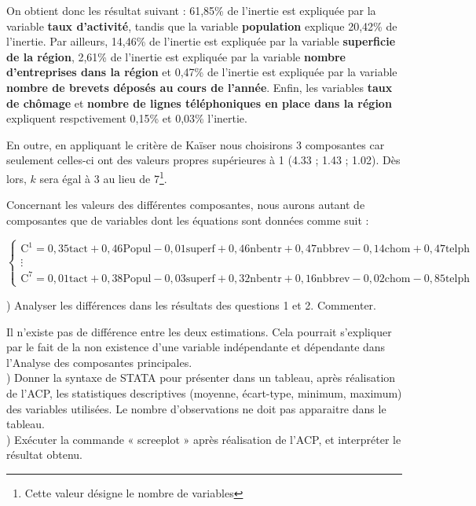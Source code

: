 On obtient donc les résultat suivant : 61,85\% de l'inertie est expliquée par la variable \textbf{taux d'activité}, tandis que la variable \textbf{population} explique 20,42\% de l'inertie. Par ailleurs, 14,46\% de l'inertie est expliquée par la variable \textbf{superficie de la région}, 2,61\% de l'inertie est expliquée par la variable \textbf{nombre d'entreprises dans la région} et 0,47\% de l'inertie est expliquée par la variable \textbf{nombre de brevets déposés au cours de l'année}. Enfin, les variables \textbf{taux de chômage} et \textbf{nombre de lignes téléphoniques en place dans la région} expliquent respctivement 0,15\% et 0,03\% l'inertie.

En outre, en appliquant le critère de Kaïser nous choisirons 3 composantes car seulement celles-ci ont des valeurs propres supérieures à 1 (4.33 ; 1.43 ; 1.02). Dès lors, $k$ sera égal à 3 au lieu de 7\footnote{Cette valeur désigne le nombre de variables}.

Concernant les valeurs des différentes composantes, nous aurons autant de composantes que de variables dont les équations sont données comme suit :

\[
\begin{cases}
	\text{C}^1 =  0,35 \text{tact} + 0,46 \text{Popul} - 0,01 \text{superf} + 0,46 \text{nbentr} + 0,47 \text{nbbrev} - 0,14 \text{chom} + 0,47 \text{telph}\\
	\vdots\\
	\text{C}^7 =  0,01 \text{tact} + 0,38 \text{Popul} - 0,03 \text{superf} + 0,32 \text{nbentr} + 0,16 \text{nbbrev} - 0,02 \text{chom} - 0,85 \text{telph}
\end{cases}
\] 

) Analyser les différences dans les résultats des questions 1 et 2. Commenter. 

Il n'existe pas de différence entre les deux estimations. Cela pourrait s'expliquer par le fait de la non existence d'une variable indépendante et dépendante dans l'Analyse des composantes principales.\\

) Donner la syntaxe de STATA pour présenter dans un tableau, après réalisation de l’ACP, les statistiques descriptives (moyenne, écart-type, minimum, maximum) des variables utilisées. Le nombre d’observations ne doit pas apparaitre dans le tableau. \\

) Exécuter la commande « screeplot » après réalisation de l’ACP, et interpréter le résultat obtenu.\\


